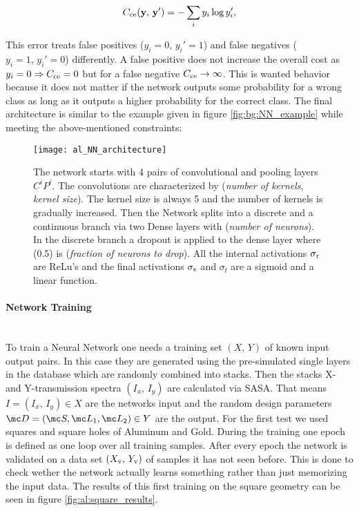 \begin{equation}
    C_{\mathrm{ce}}(\vb y, \, \vb y') = - \sum_i y_i \log y'_i,
\end{equation}

\noindent
This error treats false positives ($y_i = 0, \, y_i' = 1$) and false negatives ($y_i = 1, \, y_i' = 0$) differently. A false positive does not increase the overall cost as $y_i = 0 \Rightarrow C_{\mathrm{ce}} = 0$ but for a false negative $C_{\mathrm{ce}} \rightarrow \infty$. This is wanted behavior because it does not matter if the network outputs some probability for a wrong class as long as it outputs a higher probability for the correct class. The final architecture is similar to the example given in figure \ref{fig:bg:NN_example} while meeting the above-mentioned constraints:

\begin{figure}[H]
    \centering
    \texttt{[image: al\_NN\_architecture]}
    \caption{The network starts with 4 pairs of convolutional and pooling layers $C^i P^i   $. The convolutions are characterized by (\textit{number of kernels}, \textit{kernel size}). The kernel size is always 5 and the number of kernels is gradually increased. Then the Network splits into a discrete and a continuous branch via two Dense layers with (\textit{number of neurons}). In the discrete branch a dropout is applied to the dense layer where (0.5) is (\textit{fraction of neurons to drop}).
    All the internal activations $\sigma_{\mathrm{r}}$ are ReLu's and the final activations $\sigma_{\mathrm{s}}$ and $\sigma_{l}$ are a sigmoid and a linear function.}
    \label{fig:al:NN_architecture}
\end{figure}

\newpage
\paragraph{Network Training}~\\
To train a Neural Network one needs a training set $(X, \, Y)$ of known input output pairs. In this case they are generated using the pre-simulated single layers in the database which are randomly combined into stacks. Then the stacks X- and Y-transmission spectra $(I_x, \, I_y)$ are calculated via SASA.
That means $I = (I_x, \, I_y) \in X$ are the networks input and the random design parameters ${\mc D = (\mc S, \mc L_1, \mc L_2) \in Y}$ are the output. For the first test we used squares and square holes of Aluminum and Gold. During the training one epoch is defined as one loop over all training samples. After every epoch the network is validated on a data set $(X_{\mathrm{v}}, \, Y_{\mathrm{v}})$ of samples it has not seen before. This is done to check wether the network actually learns something rather than just memorizing the input data.  The results of this first training on the square geometry can be seen in figure \ref{fig:al:square_results}.
\\

